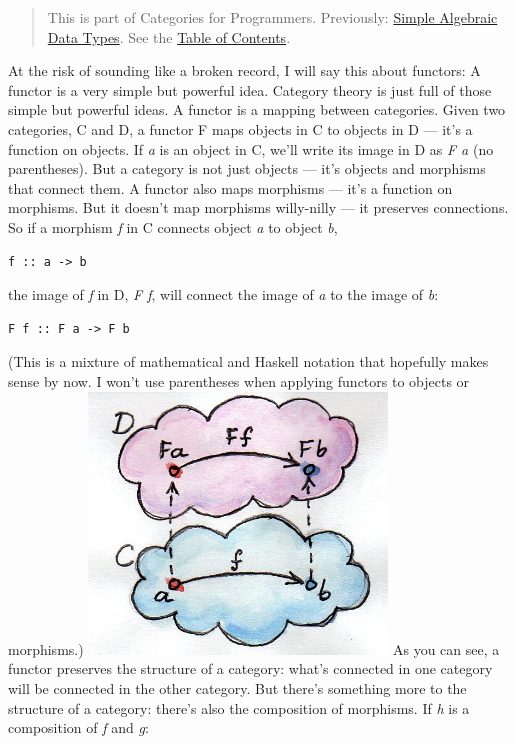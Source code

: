 \begin{quote}
This is part of Categories for Programmers. Previously:
\href{https://bartoszmilewski.com/2015/01/13/simple-algebraic-data-types/}{Simple
Algebraic Data Types}. See the
\href{https://bartoszmilewski.com/2014/10/28/category-theory-for-programmers-the-preface/}{Table
of Contents}.
\end{quote}

At the risk of sounding like a broken record, I will say this about
functors: A functor is a very simple but powerful idea. Category theory
is just full of those simple but powerful ideas. A functor is a mapping
between categories. Given two categories, C and D, a functor F maps
objects in C to objects in D --- it's a function on objects. If \emph{a}
is an object in C, we'll write its image in D as \emph{F a} (no
parentheses). But a category is not just objects --- it's objects and
morphisms that connect them. A functor also maps morphisms --- it's a
function on morphisms. But it doesn't map morphisms willy-nilly --- it
preserves connections. So if a morphism \emph{f} in C connects object
\emph{a} to object \emph{b},

\begin{verbatim}
f :: a -> b
\end{verbatim}

the image of \emph{f} in D, \emph{F f}, will connect the image of
\emph{a} to the image of \emph{b}:

\begin{verbatim}
F f :: F a -> F b
\end{verbatim}

(This is a mixture of mathematical and Haskell notation that hopefully
makes sense by now. I won't use parentheses when applying functors to
objects or morphisms.)
\includegraphics[width=3.12500in]{images/functor.jpg} As you can see, a
functor preserves the structure of a category: what's connected in one
category will be connected in the other category. But there's something
more to the structure of a category: there's also the composition of
morphisms. If \emph{h} is a composition of \emph{f} and \emph{g}:

